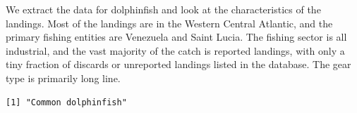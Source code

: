 \documentclass[
]{article}
\newenvironment{Shaded}{\begin{snugshade}}{\end{snugshade}}
\newcommand{\CommentTok}[1]{\textcolor[rgb]{0.37,0.37,0.37}{#1}}
\newcommand{\DecValTok}[1]{\textcolor[rgb]{0.68,0.00,0.00}{#1}}
\newcommand{\FunctionTok}[1]{\textcolor[rgb]{0.28,0.35,0.67}{#1}}
\newcommand{\NormalTok}[1]{\textcolor[rgb]{0.00,0.23,0.31}{#1}}
\newcommand{\OtherTok}[1]{\textcolor[rgb]{0.00,0.23,0.31}{#1}}
\newcommand{\SpecialCharTok}[1]{\textcolor[rgb]{0.37,0.37,0.37}{#1}}
\newcommand{\StringTok}[1]{\textcolor[rgb]{0.13,0.47,0.30}{#1}}
\begin{document}
We extract the data for dolphinfish and look at the characteristics of
the landings. Most of the landings are in the Western Central Atlantic,
and the primary fishing entities are Venezuela and Saint Lucia. The
fishing sector is all industrial, and the vast majority of the catch is
reported landings, with only a tiny fraction of discards or unreported
landings listed in the database. The gear type is primarily long line.

\begin{Shaded}
\end{Shaded}

\begin{verbatim}
[1] "Common dolphinfish"
\end{verbatim}

\begin{Shaded}
\end{Shaded}
\end{document}
